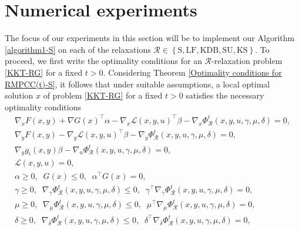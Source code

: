 
\section{Numerical experiments}\label{Numerical experiments}
The focus of our experiments in this section will be to implement our Algorithm \ref{algorithm1-S} on each of the relaxations $\mathcal{R}\in \left\{\mbox{S}, \mbox{LF}, \mbox{KDB}, \mbox{SU}, \mbox{KS}\right\}$. %
To proceed, we first write the optimality conditions for an $\mathcal{R}$-relaxation problem \eqref{KKT-RG} for a fixed $t>0$. Considering Theorem \ref{Optimality conditions for RMPCC(t)-S}, it follows that under suitable assumptions, a local optimal solution $x$ of problem \eqref{KKT-RG} for a fixed $t>0$ satisfies the necessary optimality conditions
\begin{eqnarray}
\nabla_{x}F(x,y)+\nabla G(x)^{\top}\alpha-\nabla
_{x}\mathcal{L}(x,y,u)^{\top}\beta  -  \nabla_{x}
\Phi^{t}_{\mathcal{R}}(x,y,u,\gamma, \mu, \delta)=0,\label{Er1S1}\\
\nabla_{y}F(x,y)-\nabla_{y}\mathcal{L}(x,y,u)^{\top}
\beta -     \nabla_{y}
\Phi^{t}_{\mathcal{R}}(x,y,u,\gamma, \mu, \delta)=0,\\
 \nabla_{y}g_{i}(x,y)\beta -\nabla_{u}
\Phi^{t}_{\mathcal{R}}(x,y,u,\gamma, \mu, \delta)=0,\\%
\mathcal{L}(x,y,u)  = 0, \\
\alpha \geq 0, \; \; G(x) \leq 0, \;\; \alpha^\top G(x) = 0, \label{Doctrine-1}\\
\gamma \geq 0, \; \; \nabla_{\gamma}\Phi_{\mathcal{R}}^{t}(x,y,u,\gamma,\mu,\delta) \leq 0, \; \; \gamma^\top \nabla_{\gamma}\Phi_{\mathcal{R}}^{t}(x,y,u,\gamma,\mu,\delta) = 0, \\
\mu \geq 0, \; \;  \nabla_{\mu}\Phi_{\mathcal{R}}^{t}(x,y,u,\gamma,\mu,\delta) \leq 0, \; \; \mu^\top \nabla_{\mu}\Phi_{\mathcal{R}}^{t}(x,y,u,\gamma,\mu,\delta) = 0, \\
\delta \geq 0, \; \; \nabla_{\delta}\Phi_{\mathcal{R}}^{t}(x,y,u,\gamma,\mu,\delta) \leq 0, \; \; \delta^\top \nabla_{\delta}\Phi_{\mathcal{R}}^{t}(x,y,u,\gamma,\mu,\delta) = 0, \label{Er1S2}
\end{eqnarray}
